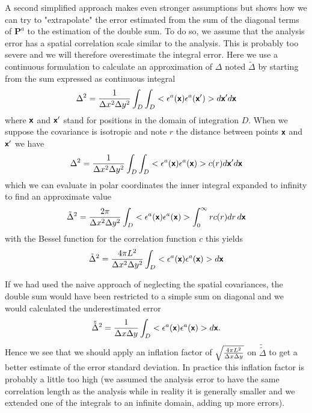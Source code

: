 A second simplified approach makes even stronger assumptions but shows how we can try to "extrapolate" the error estimated from the sum of the diagonal terms of $\mathbf{P}^a$ to the estimation of the double sum. To do so, we assume that the analysis error has a spatial correlation scale similar to the analysis.
This is probably too severe and we will therefore overestimate the integral error. 
Here we use a continuous formulation to calculate an approximation of $\Delta$ noted $\tilde{\Delta}$ by starting from the sum expressed as continuous integral
\begin{equation}
{\Delta}^2= {1 \over \Delta x^2 \Delta y^2} \int_D \int_D <{\epsilon}^a(\mbox{\boldmath $ \protect\mathsf{x} $}) {\epsilon}^a(\mbox{\boldmath $ \protect\mathsf{x} $}^\prime)> d \mbox{\boldmath $ \protect\mathsf{x} $}^\prime d \mbox{\boldmath $ \protect\mathsf{x} $} 
\end{equation}
where $\mbox{\boldmath $ \protect\mathsf{x} $}$ and $\mbox{\boldmath $ \protect\mathsf{x} $}^\prime$ stand for positions in the domain of integration $D$. When we suppose the covariance is isotropic and note $r$ the distance between points
$\mbox{\boldmath $ \protect\mathsf{x} $}$ and $\mbox{\boldmath $ \protect\mathsf{x} $}^\prime$ we have 
\begin{equation}
{\Delta}^2= {1 \over \Delta x^2 \Delta y^2} \int_D \int_D <{\epsilon}^a(\mbox{\boldmath $ \protect\mathsf{x} $}) {\epsilon}^a(\mbox{\boldmath $ \protect\mathsf{x} $}) > c(r) d \mbox{\boldmath $ \protect\mathsf{x} $}^\prime d \mbox{\boldmath $ \protect\mathsf{x} $}  
\end{equation}
which we can evaluate in polar coordinates the inner integral expanded to infinity to find an approximate value
\begin{equation}
\tilde{\Delta}^2= {2 \pi \over \Delta x^2 \Delta y^2} \int_D <{\epsilon}^a(\mbox{\boldmath $ \protect\mathsf{x} $}) {\epsilon}^a(\mbox{\boldmath $ \protect\mathsf{x} $}) > \int_0^{\infty}  r c(r) d r \, d \mbox{\boldmath $ \protect\mathsf{x} $}
\end{equation}
with the Bessel function for the correlation function $c$ this yields
\begin{equation}
\tilde{\Delta}^2= {4 \pi L^2 \over \Delta x^2 \Delta y^2} \int_D <{\epsilon}^a(\mbox{\boldmath $ \protect\mathsf{x} $}) {\epsilon}^a(\mbox{\boldmath $ \protect\mathsf{x} $}) >  d \mbox{\boldmath $ \protect\mathsf{x} $}
\end{equation}

If we had used the naive approach of neglecting the spatial covariances, the double sum would have been restricted to a simple sum on diagonal and we would calculated the underestimated error 
\begin{equation}
\tilde{\tilde{\Delta}}^2= {1 \over \Delta x \Delta y} \int_D <{\epsilon}^a(\mbox{\boldmath $ \protect\mathsf{x} $}) {\epsilon}^a(\mbox{\boldmath $ \protect\mathsf{x} $}) >  d \mbox{\boldmath $ \protect\mathsf{x} $}.
\end{equation}
Hence we see that we should apply an inflation factor of $\sqrt{{4 \pi L^2 \over \Delta x \Delta y}}$ on $\tilde{\tilde{\Delta}}$ to get a better estimate of the error standard deviation. In practice this inflation factor is probably a little too high (we assumed the analysis error to have the same correlation length as the analysis while in reality it is generally smaller and we extended one of the integrals to an infinite domain, adding up more errors).

